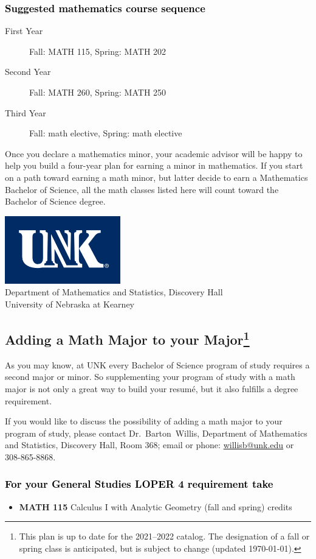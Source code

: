 \documentclass[10pt]{article}
\makeatletter
\newcommand{\calcone}{\textbf{MATH 115} Calculus I with Analytic Geometry (fall and spring) \dotfill 5 credits}
\newcommand{\contactbw}{\mbox{Dr.\ Barton Willis}, Department of Mathematics and Statistics,  Discovery Hall, Room 368;
email or phone: \href{mailto:willisb@unk.edu}{willisb@unk.edu} or 308-865-8868.}
\newcommand{\forinfo}[2]{If you would like to discuss the possibility of adding a math {#1} to your {#2}, please contact \contactbw}
\newcommand{\catalog}{2021--2022 }
\newcommand{\myfootnote}{\footnote{This plan is up to date for  the \catalog catalog. The designation of a fall or spring class is 
anticipated, but  is subject to change (updated  \today).}}
\newcommand{\myheading}{
\begin{flushleft}
\includegraphics[scale=0.35]{unk-logo}\\
\setcounter{footnote}{0}
\vspace{0.25in}
 \textcolor{unkblue}{Department of Mathematics and Statistics, Discovery Hall} \\
  \textcolor{unkblue}{University of Nebraska at Kearney}
\end{flushleft}}
\makeatother
\begin{document}
\subsubsection*{\textcolor{black}{Suggested mathematics course sequence}}

\begin{description}
   \item[\phantom{xxx} First Year] Fall: MATH 115, Spring:  MATH 202
      \item[\phantom{xxx} Second Year]  Fall: MATH 260,  Spring: MATH 250
     \item[\phantom{xxx} Third Year]  Fall: math elective, Spring: math elective
 \end{description}
  \vspace{0.1in}

 \noindent Once you declare a mathematics minor, your academic advisor will be happy to help you build a four-year plan for earning a minor in mathematics.  If you start on a path toward earning a math minor, but latter decide to earn a  Mathematics Bachelor of Science, all the math classes listed here will count toward the Bachelor of Science degree.

   \vspace{0.1in}

\newpage

\myheading


\subsection*{\textbf{\textcolor{unkblue}{Adding a Math Major to your Major\myfootnote}}}

As you may know, at UNK every Bachelor of Science program of study requires a second
major or minor. So supplementing your  program of study with a math major is not only a great
way to build your resum\'e, but it also fulfills a degree requirement.


\forinfo{major}{program of study}

\subsubsection*{\textcolor{black}{For your General Studies LOPER 4 requirement take}}
\begin{itemize}
\item \calcone
\end{itemize}
\end{document}
